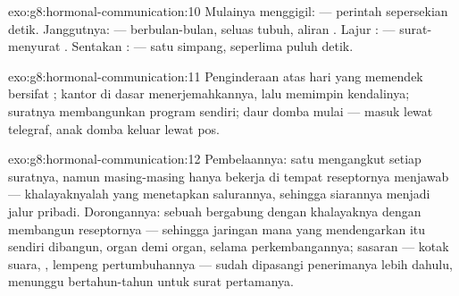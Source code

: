 \begin{solution}{exo:g8:hormonal-communication:10}
Mulainya menggigil:  --- perintah  sepersekian
detik. Janggutnya:  --- berbulan-bulan, seluas tubuh,
aliran . Lajur :  --- surat-menyurat
. Sentakan :  --- satu simpang,
seperlima puluh detik.
\end{solution}

\begin{solution}{exo:g8:hormonal-communication:11}
Penginderaan  atas hari yang memendek bersifat ;
kantor di dasar  menerjemahkannya, lalu memimpin
 kendalinya; suratnya membangunkan program 
 sendiri; daur domba  mulai ---
 masuk lewat telegraf, anak domba keluar lewat pos.
\end{solution}

\begin{solution}{exo:g8:hormonal-communication:12}
Pembelaannya: satu  mengangkut setiap suratnya, namun
masing-masing hanya bekerja di tempat reseptornya menjawab
--- khalayaknyalah yang menetapkan salurannya, sehingga
siarannya menjadi jalur pribadi. Dorongannya: sebuah 
bergabung dengan khalayaknya dengan membangun reseptornya
--- sehingga jaringan mana yang mendengarkan itu sendiri
dibangun, organ demi organ, selama perkembangannya; sasaran
 --- kotak suara, , lempeng pertumbuhannya
--- sudah dipasangi penerimanya lebih dahulu, menunggu
bertahun-tahun untuk surat pertamanya.
\end{solution}

